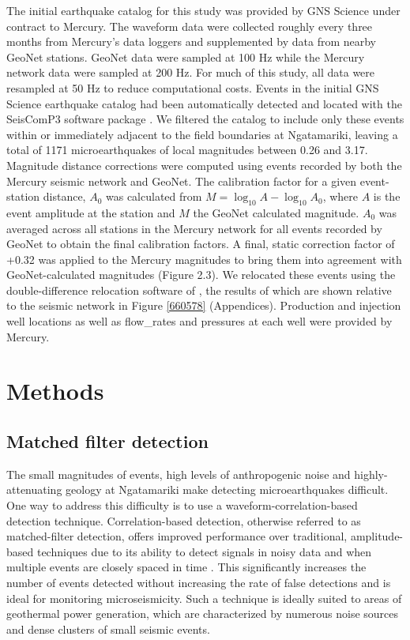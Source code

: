 The initial earthquake catalog for this study was provided by GNS Science under contract to Mercury. The waveform data were collected roughly every three months from Mercury's data loggers and supplemented by data from nearby GeoNet stations. GeoNet data were sampled at 100 Hz while the Mercury network data were sampled at 200 Hz. For much of this study, all data were resampled at 50 Hz to reduce computational costs. Events in the initial GNS Science earthquake catalog had been automatically detected and located with the SeisComP3 software package \citep{Weber2007}. We filtered the catalog to include only these events within or immediately adjacent to the field boundaries at Ngatamariki, leaving a total of 1171 microearthquakes of local magnitudes between 0.26 and 3.17. Magnitude distance corrections were computed using events recorded by both the Mercury seismic network and GeoNet. The calibration factor for a given event-station distance, $A_0$ was calculated from $M = \log_{10}A - \log_{10}A_{0}$, where $A$ is the event amplitude at the station and $M$ the GeoNet calculated magnitude. $A_{0}$ was averaged across all stations in the Mercury network for all events recorded by GeoNet to obtain the final calibration factors. A final, static correction factor of +0.32 was applied to the Mercury magnitudes to bring them into agreement with GeoNet-calculated magnitudes (Figure 2.3). We relocated these events using the double-difference relocation software of \citet{Trugman_2017}, the results of which are shown relative to the seismic network in Figure \ref{660578} (Appendices). Production and injection well locations as well as \glspl{flow_rate} and pressures at each well were provided by Mercury.

\section{Methods}
\subsection{Matched filter detection}

The small magnitudes of events, high levels of anthropogenic noise and highly-attenuating geology  at Ngatamariki make detecting microearthquakes difficult. One way to address this difficulty is to use a waveform-correlation-based detection technique. Correlation-based detection, otherwise referred to as matched-filter detection, offers improved performance over traditional, amplitude-based techniques due to its ability to detect signals in noisy data and when multiple events are closely spaced in time \citep{Gibbons_2006, Shelly_2007}. This significantly increases the number of events detected without increasing the rate of false detections and is ideal for monitoring microseismicity. Such a technique is ideally suited to areas of geothermal power generation, which are characterized by numerous noise sources and dense clusters of small seismic events.

